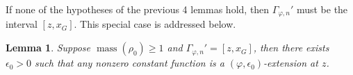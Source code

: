 \documentclass[10pt,reqno]{amsart}
\theoremstyle{plain}
\newtheorem{lemma}[theorem]{Lemma}
\theoremstyle{definition}
\renewcommand{\H}{\mathcal{H}}
\numberwithin{equation}{section}
\DeclareMathOperator{\Ends}{Ends}
\DeclareMathOperator{\mass}{mass}
\DeclareMathOperator{\rig}{rig}
\begin{document}
\begin{comment}
\begin{lemma}
\label{lemma:five_variant}

\end{lemma}


Let us now summarize the proof of~\cref{thm:otvariant}: if $\mass(\rho_0) < 1$, then a $(\varphi,\epsilon_0)$-extension at $z$ exists by \cref{lemma:one_variant}. Suppose now that $\mass(\rho_0) \geq 1$; in particular, $\Gamma_{\varphi,n} \not= \emptyset$ and $\Ends(\Gamma_{\varphi,n}) \not= \emptyset$. As discussed at the start of the section, we assume that $\varphi$ is locally constant off of the convex hull of $\Gamma_{\varphi} \cup \{ z \}$. By repeatedly applying \cref{lemma:two_variant},  \cref{lemma:three_variant}, and \cref{lemma:four_variant}, we may assume that $\Ends(\Gamma_{\varphi,n})$ consists of a type-2 or type-3 point onto which $z$ retracts, and the ends of $\Gamma_{\varphi,n}$ includes at most finitely-many ends, withthe mass of $\varphi$ just below 1 at each additional point. This is precisely the setting of \cref{lemma:five_variant}, which then asserts that a $(\varphi,\epsilon_0)$-extension at $z$ exists. Now, if $z \in X^{\rig}$ and $k = k^a$, then $\H(z) = k$, so the second assertion is immediate from the first. This concludes the proof of~\cref{thm:otvariant}.

\end{comment}

If none of the hypotheses of the previous 4 lemmas hold, then $\Gamma_{\varphi,n}'$ must be the interval $[z,x_G]$. 
This special case is addressed below.
\begin{lemma}\label{lemma:five_variant}
Suppose $\mass(\rho_0) \geq 1$ and $\Gamma_{\varphi,n}' = [z,x_G]$, then there exists $\epsilon_0 > 0$ such that any nonzero constant function is a $(\varphi,\epsilon_0)$-extension at $z$. 
\end{lemma}
\end{document}
